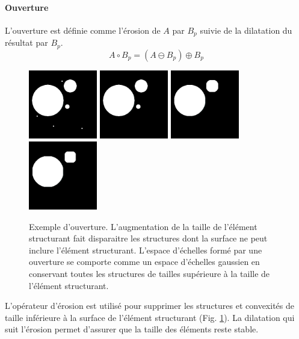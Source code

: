 \paragraph{Ouverture}
L'ouverture est définie comme l'érosion de $A$ par $B_p$ suivie de la dilatation du résultat par $B_p$.
\begin{equation}
 A \circ B_p = (A \ominus B_p) \oplus B_p
\end{equation}
\begin{figure}[h]
  \centering
  \includegraphics[height=3cm]{Images/morpho_init.png}
  \includegraphics[height=3cm]{Images/morpho_open_k5.png}
  \includegraphics[height=3cm]{Images/morpho_open_k21.png}
  \includegraphics[height=3cm]{Images/morpho_open_k31.png}
  \caption{Exemple d'ouverture. L'augmentation de la taille de l'élément structurant fait disparaitre les structures dont la surface ne peut inclure l'élément structurant. L'espace d'échelles formé par une ouverture se comporte comme un espace d'échelles gaussien en conservant toutes les structures de tailles supérieure à la taille de l'élément structurant. }
  \label{fig:morpho_ouverture}
\end{figure}
L'opérateur d'érosion est utilisé pour supprimer les structures et convexités de taille inférieure à la surface de l'élément structurant (Fig. \ref{fig:morpho_ouverture}). La dilatation qui suit l'érosion permet d'assurer que la taille des éléments reste stable.
